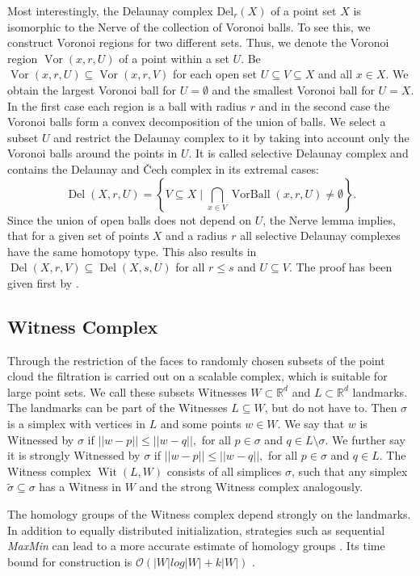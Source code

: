 \documentclass[runningheads]{llncs}
\DeclareMathOperator{\VorBall}{\text{VorBall}}
\DeclareMathOperator{\Vor}{\text{Vor}}
\DeclareMathOperator{\Del}{\text{Del}}
\DeclareMathOperator{\Wit}{\text{Wit}}
\begin{document}
Most interestingly, the Delaunay complex $\text{Del}_r(X)$ of a point set $X$ is isomorphic to the Nerve of the collection of Voronoi balls. To see this, we construct Voronoi regions for two different sets. Thus, we denote the Voronoi region $\Vor(x,r,U)$ of a point within a set $U$. Be $\Vor(x,r,U) \subseteq \Vor(x,r,V)$ for each open set $U \subseteq V \subseteq X$ and all $x \in X$. We obtain the largest Voronoi ball for $U = \emptyset$ and the smallest Voronoi ball for $U = X$. In the first case each region is a ball with radius $r$ and in the second case the Voronoi balls form a convex decomposition of the union of balls. We select a subset $U$ and restrict the Delaunay complex to it by taking into account only the Voronoi balls around the points in $U$. It is called selective Delaunay complex and contains the Delaunay and \v{Cech} complex in its extremal cases:
\begin{equation}
\Del(X,r,U) = \left\{V \subseteq X \; \bigg\vert \; \bigcap_{x \in V} \VorBall(x,r,U) \neq \emptyset \right\}.
\end{equation}
Since the union of open balls does not depend on $U$, the Nerve lemma implies, that for a given set of points $X$ and a radius $r$ all selective Delaunay complexes have the same homotopy type. This also results in $\Del(X,r,V) \subseteq \Del(X,s,U)$ for all $r \leq s$ and $U \subseteq V$. The proof has been given first by \cite[§3.4]{bauer2017morse}.

\subsection{Witness Complex}
Through the restriction of the faces to randomly chosen subsets of the point cloud the filtration is carried out on a scalable complex, which is suitable for large point sets. We call these subsets Witnesses $W \subset \mathbb{R}^d$ and $L \subset \mathbb{R}^d$ landmarks. The landmarks can be part of the Witnesses $L \subseteq W$, but do not have to. Then $\sigma$ is a simplex with vertices in $L$ and some points $w \in W$. We say that $w$ is Witnessed by $\sigma$ if $||w-p|| \leq ||w-q||,$ for all $p \in \sigma$ and $q \in L \setminus \sigma.$ We further say it is strongly Witnessed by $\sigma$ if $||w-p|| \leq ||w-q||,$ for all $p \in \sigma$ and $q \in L$. The Witness complex $\Wit(L,W)$ consists of all simplices $\sigma$, such that any simplex $\tilde{\sigma} \subseteq \sigma$ has a Witness in $W$ and the strong Witness complex analogously.

The homology groups of the Witness complex depend strongly on the landmarks. In addition to equally distributed initialization, strategies such as sequential \textit{MaxMin} can lead to a more accurate estimate of homology groups \cite{de2004topological}. Its time bound for construction is $\mathcal{O}\left(|W|log|W|+k|W|\right)$ \cite{boissonnat2018geometric}.
\end{document}
